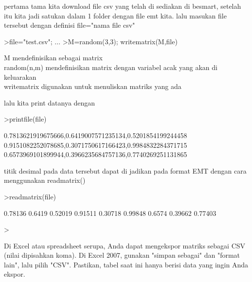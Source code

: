 \documentclass[a4paper,10pt]{article}
\begin{document}
\begin{eulernotebook}
\begin{eulercomment}
\begin{eulercomment}
\begin{eulercomment}
\begin{eulercomment}
\begin{eulercomment}
\begin{eulercomment}
\begin{eulercomment}
\begin{eulercomment}
\begin{eulercomment}
\begin{eulercomment}
\begin{eulercomment}
pertama tama kita download file csv yang telah di sediakan di besmart,
setelah itu kita jadi satukan dalam 1 folder dengan file emt kita.
lalu masukan file tersebut dengan definisi file="nama file csv"
\end{eulercomment}
\begin{eulerprompt}
>file="test.csv";  ...
>M=random(3,3); writematrix(M,file)
\end{eulerprompt}
\begin{eulercomment}
M mendefinisikan sebagai matrix\\
random(n,m) mendefinisikan matrix dengan variabel acak yang akan di
keluarakan\\
writematrix digunakan untuk menuliskan matriks yang ada

lalu kita print datanya dengan
\end{eulercomment}
\begin{eulerprompt}
>printfile(file)
\end{eulerprompt}
\begin{euleroutput}
  0.7813621919675666,0.6419007571235134,0.5201854199244458
  0.9151082252078685,0.3071750617166423,0.9984832284371715
  0.6573969101899944,0.3966235684757136,0.7740269251131865
  
\end{euleroutput}
\begin{eulercomment}
titik desimal pada data tersebut dapat di jadikan pada format EMT
dengan cara menggunakan readmatrix()
\end{eulercomment}
\begin{eulerprompt}
>readmatrix(file)
\end{eulerprompt}
\begin{euleroutput}
    0.78136    0.6419   0.52019 
    0.91511   0.30718   0.99848 
     0.6574   0.39662   0.77403 
\end{euleroutput}
\begin{eulerprompt}
> 
\end{eulerprompt}
\begin{eulercomment}
Di Excel atau spreadsheet serupa, Anda dapat mengekspor matriks
sebagai CSV (nilai dipisahkan koma). Di Excel 2007, gunakan "simpan
sebagai" dan "format lain", lalu pilih "CSV". Pastikan, tabel saat ini
hanya berisi data yang ingin Anda ekspor.


\end{eulercomment}
\end{eulercomment}
\end{eulercomment}
\end{eulercomment}
\end{eulercomment}
\end{eulercomment}
\end{eulercomment}
\end{eulercomment}
\end{eulercomment}
\end{eulercomment}
\end{eulercomment}
\end{eulernotebook}
\end{document}
